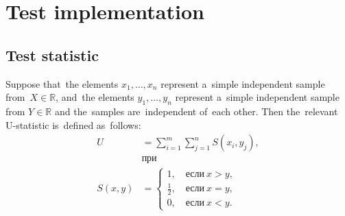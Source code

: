 \documentclass[]{scrreprt}
\begin{document}
\section{Test implementation}
\subsection{Test statistic}
Suppose that~the elements $x_{1},\ldots,x_{n}$ represent a~simple independent sample from~$X \in \mathbb{R}$, and~the elements $y_{1},\ldots, y_{n}$ represent a~simple independent sample from $Y \in \mathbb{R}$ and the~samples are~independent of~each other. Then the~relevant U-statistic is~defined as~follows:
\begin{equation}\label{eq:U-statistic-base-formula}
\begin{aligned}
U&=\sum_{i=1}^{m} \sum_{j=1}^{n} S (x_{i},y_{j}),\\
&\text{при}\\
S(x,y)&=
\begin{cases}
1,\quad \text{если}\ x>y,\\
\frac{1}{2},\quad \text{если}\ x=y,\\
0,\quad \text{если}\ x<y.
\end{cases}
\end{aligned}
\end{equation}
%
\end{document}
